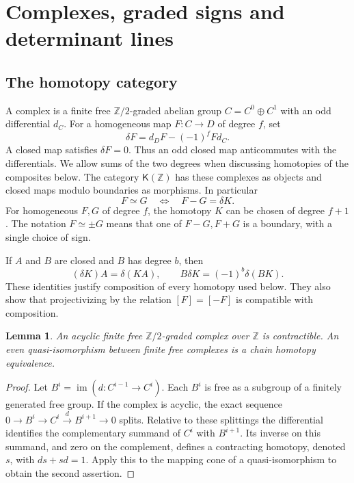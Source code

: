\documentclass[11pt]{amsart}
\newtheorem{lemma}[theorem]{Lemma}
\theoremstyle{definition}
\theoremstyle{remark}
\theoremstyle{plain}
\numberwithin{equation}{section}
\newcommand{\ZZ}{\mathbb Z}
\newcommand{\cK}{\mathsf K}
\newcommand{\im}{\operatorname{im}}
\begin{document}
\section{Complexes, graded signs and determinant lines}\label{sec:algebra}

\subsection{The homotopy category}
A complex is a finite free $\ZZ/2$-graded abelian group
$C=C^0\oplus C^1$ with an odd differential $d_C$. For a homogeneous
map $F:C\to D$ of degree $f$, set
\begin{equation}\label{eq:hom-differential}
 \delta F=d_DF-(-1)^fFd_C.
\end{equation}
A closed map satisfies $\delta F=0$. Thus an odd closed map
anticommutes with the differentials. We allow sums of the two
degrees when discussing homotopies of the composites below.
The category $\cK(\ZZ)$ has these complexes as objects and closed
maps modulo boundaries as morphisms. In particular
\[
 F\simeq G\quad\Longleftrightarrow\quad F-G=\delta K.
\]
For homogeneous $F,G$ of degree $f$, the homotopy $K$ can be
chosen of degree $f+1$. The notation $F\simeq\pm G$ means that
one of $F-G,F+G$ is a boundary, with a single choice of sign.

If $A$ and $B$ are closed and $B$ has degree $b$, then
\begin{equation}\label{eq:compose-homotopy}
 (\delta K)A=\delta(KA),\qquad
 B\delta K=(-1)^b\delta(BK).
\end{equation}
These identities justify composition of every homotopy used below.
They also show that projectivizing by the relation $[F]=[-F]$
is compatible with composition.

\begin{lemma}\label{lem:acyclic}
An acyclic finite free $\ZZ/2$-graded complex over $\ZZ$ is
contractible. An even quasi-isomorphism between finite free
complexes is a chain homotopy equivalence.
\end{lemma}
\begin{proof}
Let $B^i=\im(d:C^{i-1}\to C^i)$. Each $B^i$ is free as a
subgroup of a finitely generated free group. If the complex is
acyclic, the exact sequence
$0\to B^i\to C^i\xrightarrow{d}B^{i+1}\to0$ splits. Relative
to these splittings the differential identifies the complementary
summand of $C^i$ with $B^{i+1}$. Its inverse on this summand,
and zero on the complement, defines a contracting homotopy, denoted
$s$, with $ds+sd=1$.
Apply this to the mapping cone of a quasi-isomorphism to obtain
the second assertion.
\end{proof}
\end{document}

